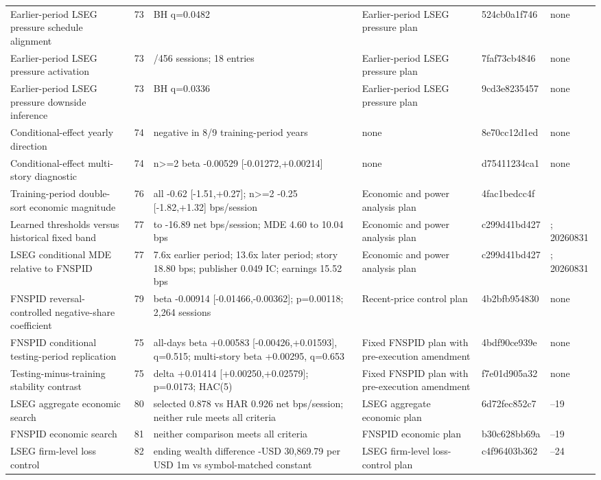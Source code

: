 \begin{longtable}{@{}>{\raggedright\arraybackslash}p{4.8cm} r >{\raggedright\arraybackslash}p{6.2cm} >{\raggedright\arraybackslash}p{5.2cm} l >{\raggedright\arraybackslash}p{2.4cm}@{}}
Earlier-period LSEG pressure schedule alignment & 73 & BH q=0.0482 & Earlier-period LSEG pressure plan & 524cb0a1f746 & none \\
Earlier-period LSEG pressure activation & 73 & 53/456 sessions; 18 entries & Earlier-period LSEG pressure plan & 7faf73cb4846 & none \\
Earlier-period LSEG pressure downside inference & 73 & BH q=0.0336 & Earlier-period LSEG pressure plan & 9cd3e8235457 & none \\
Conditional-effect yearly direction & 74 & negative in 8/9 training-period years & none & 8e70cc12d1ed & none \\
Conditional-effect multi-story diagnostic & 74 & n>=2 beta -0.00529 [-0.01272,+0.00214] & none & d75411234ca1 & none \\
Training-period double-sort economic magnitude & 76 & all -0.62 [-1.51,+0.27]; n>=2 -0.25 [-1.82,+1.32] bps/session & Economic and power analysis plan & 4fac1bedcc4f & 20260812 \\
Learned thresholds versus historical fixed band & 77 & -7.72 to -16.89 net bps/session; MDE 4.60 to 10.04 bps & Economic and power analysis plan & c299d41bd427 & 20260731; 20260831 \\
LSEG conditional MDE relative to FNSPID & 77 & 7.6x earlier period; 13.6x later period; story 18.80 bps; publisher 0.049 IC; earnings 15.52 bps & Economic and power analysis plan & c299d41bd427 & 20260731; 20260831 \\
FNSPID reversal-controlled negative-share coefficient & 79 & beta -0.00914 [-0.01466,-0.00362]; p=0.00118; 2,264 sessions & Recent-price control plan & 4b2bfb954830 & none \\
FNSPID conditional testing-period replication & 75 & all-days beta +0.00583 [-0.00426,+0.01593], q=0.515; multi-story beta +0.00295, q=0.653 & Fixed FNSPID plan with pre-execution amendment & 4bdf90ce939e & none \\
Testing-minus-training stability contrast & 75 & delta +0.01414 [+0.00250,+0.02579]; p=0.0173; HAC(5) & Fixed FNSPID plan with pre-execution amendment & f7e01d905a32 & none \\
LSEG aggregate economic search & 80 & selected 0.878 vs HAR 0.926 net bps/session; neither rule meets all criteria & LSEG aggregate economic plan & 6d72fec852c7 & 20260912--19 \\
FNSPID economic search & 81 & neither comparison meets all criteria & FNSPID economic plan & b30c628bb69a & 20261012--19 \\
LSEG firm-level loss control & 82 & ending wealth difference -USD 30,869.79 per USD 1m vs symbol-matched constant & LSEG firm-level loss-control plan & c4f96403b362 & 20260913--24 \\

\end{longtable}

